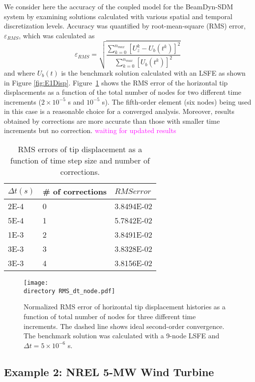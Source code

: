 \documentclass{aiaa-tc}
\def\directory{EPSF/}
\newcommand{\mas}[1]{\textcolor{magenta}{#1}}
\begin{document}
We consider here the accuracy of the coupled model for the BeamDyn-SDM system by examining solutions calculated with various spatial and temporal discretization levels.
Accuracy was quantified by root-mean-square (RMS) error, $\varepsilon_{RMS}$,  which was calculated as
\begin{equation}
\varepsilon_{RMS}=\sqrt{\frac{\sum_{k=0}^{n_{max}}[U_z^k-U_b(t^k)]^2}{\sum_{k=0}^{n_{max}}[U_b(t^k)]^2}}
\label{RMSdefi}
\end{equation} 
and where $U_b(t)$ is the benchmark solution calculated with an LSFE as shown in Figure \ref{fig:E1Disp}. Figure~\ref{fig:ConvDTNode} shows the RMS error of the horizontal tip displacements as a function of the total number of nodes for two different time increments ($2 \times 10^{-5}$ s and $10^{-5}$ s).
The fifth-order element (six nodes) being used in this case is a reasonable choice for a converged analysis. 
Moreover, results obtained by corrections are more accurate than those with smaller time increments but no correction.
\mas{waiting for updated results}
\begin{table}[h]
    \centering
    \begin{tabular}{| l | l | l |}
    \hline
    $\Delta t (s)$ & \# of corrections & $RMS error$ \\ \hline
    2E-4 & 0 & 3.8494E-02 \\ \hline
    5E-4 & 1 & 5.7842E-02 \\ \hline
    1E-3 & 2 & 3.8491E-02 \\ \hline
    3E-3 & 3 & 3.8328E-02 \\ \hline
    3E-3 & 4 & 3.8156E-02 \\
    \hline
    \end{tabular}
    \label{tab:RMS_pc}
    \caption{RMS errors of tip displacement as a function of time step size and number of corrections.}
\end{table}

\begin{figure}[h!tp]
\centering
\texttt{[image: \\directory RMS\_dt\_node.pdf]}
\caption{Normalized RMS error of horizontal tip displacement  histories as a function of total number of nodes for three different time increments. The dashed line shows ideal second-order convergence. The benchmark solution was calculated with a 9-node LSFE and $\Delta t = 5 \times 10^{-6}$ s.} 
\label{fig:ConvDTNode}
\end{figure}

\subsection{Example 2: NREL 5-MW Wind Turbine}
\end{document}
